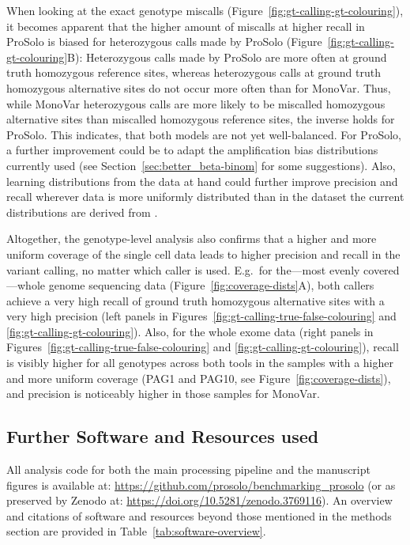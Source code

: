 \documentclass[authoryear,preprint,11pt]{scrartcl}
\begin{document}
When looking at the exact genotype miscalls (Figure~\ref{fig:gt-calling-gt-colouring}), it becomes apparent that the higher amount of miscalls at higher recall in ProSolo is biased for heterozygous calls made by ProSolo (Figure~\ref{fig:gt-calling-gt-colouring}B):
Heterozygous calls made by ProSolo are more often at ground truth homozygous reference sites, whereas heterozygous calls at ground truth homozygous alternative sites do not occur more often than for MonoVar.
Thus, while MonoVar heterozygous calls are more likely to be miscalled homozygous alternative sites than miscalled homozygous reference sites, the inverse holds for ProSolo.
This indicates, that both models are not yet well-balanced.
For ProSolo, a further improvement could be to adapt the amplification bias distributions currently used (see Section~\ref{sec:better_beta-binom} for some suggestions).
Also, learning distributions from the data at hand could further improve precision and recall wherever data is more uniformly distributed than in the dataset the current distributions are derived from \citep{lodato_somatic_2015}.

Altogether, the genotype-level analysis also confirms that a higher and more uniform coverage of the single cell data leads to higher precision and recall in the variant calling, no matter which caller is used.
E.g.~for the---most evenly covered---whole genome sequencing data (Figure~\ref{fig:coverage-dists}A), both callers achieve a very high recall of ground truth homozygous alternative sites with a very high precision (left panels in Figures~\ref{fig:gt-calling-true-false-colouring} and \ref{fig:gt-calling-gt-colouring}).
Also, for the whole exome data (right panels in Figures~\ref{fig:gt-calling-true-false-colouring} and \ref{fig:gt-calling-gt-colouring}), recall is visibly higher for all genotypes across both tools in the samples with a higher and more uniform coverage (PAG1 and PAG10, see Figure~\ref{fig:coverage-dists}), and precision is noticeably higher in those samples for MonoVar.

\subsection{Further Software and Resources used}

All analysis code for both the main processing pipeline and the manuscript figures is available at: \url{https://github.com/prosolo/benchmarking_prosolo} (or as preserved by Zenodo at: \url{https://doi.org/10.5281/zenodo.3769116}).
An overview and citations of software and resources beyond those mentioned in the methods section are provided in Table~\ref{tab:software-overview}.
\end{document}
